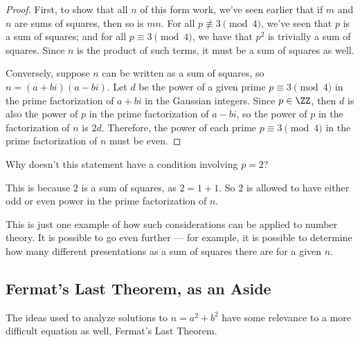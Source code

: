 \begin{proof}
First, to show that all $n$ of this form work, we've seen earlier that if $m$ and $n$ are sums of squares, then so is $mn$. For all $p \not\equiv 3 \pmod{4}$, we've seen that $p$ is a sum of squares; and for all $p \equiv 3 \pmod{4}$, we have that $p^2$ is trivially a sum of squares. Since $n$ is the product of such terms, it must be a sum of squares as well. 

Conversely, suppose $n$ can be written as a sum of squares, so $n = (a + bi)(a - bi)$. Let $d$ be the power of a given prime $p \equiv 3 \pmod{4}$ in the prime factorization of $a + bi$ in the Gaussian integers. Since $p \in \ZZ$, then $d$ is also the power of $p$ in the prime factorization of $a - bi$, so the power of $p$ in the factorization of $n$ is $2d$. Therefore, the power of each prime $p \equiv 3 \pmod{4}$ in the prime factorization of $n$ must be even.  
\end{proof}

\begin{question}
Why doesn't this statement have a condition involving $p = 2$?
\end{question}

\begin{ans}
This is because $2$ is a sum of squares, as $2 = 1 + 1$. So $2$ is allowed to have either odd or even power in the prime factorization of $n$. 
\end{ans}

This is just one example of how such considerations can be applied to number theory. It is possible to go even further --- for example, it is possible to determine how many different presentations as a sum of squares there are for a given $n$. 

\subsection{Fermat's Last Theorem, as an Aside}

The ideas used to analyze solutions to $n = a^2 + b^2$ have some relevance to a more difficult equation as well, Fermat's Last Theorem. 


